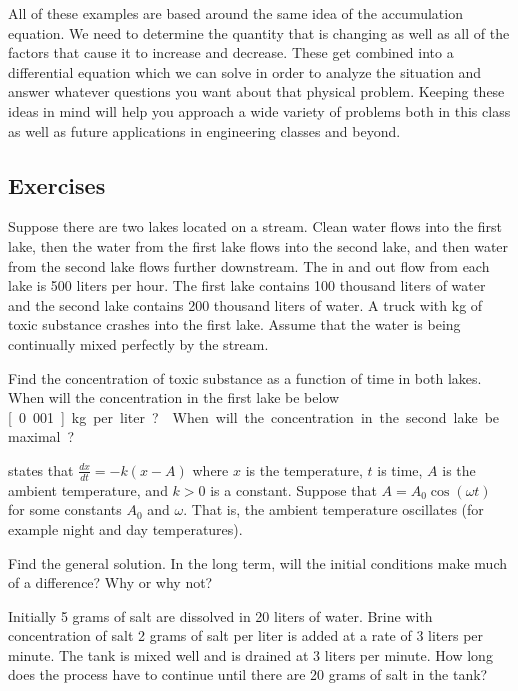 All of these examples are based around the same idea of the accumulation equation. We need to determine the quantity that is changing as well as all of the factors that cause it to increase and decrease. These get combined into a differential equation which we can solve in order to analyze the situation and answer whatever questions you want about that physical problem. Keeping these ideas in mind will help you approach a wide variety of problems both in this class as well as future applications  in engineering classes and beyond.

\subsection{Exercises}

\begin{exercise}
Suppose there are two lakes located on a stream.  Clean
water flows into the first lake,
then the water from the first lake flows into the second lake, and then
water from the second lake flows further downstream.
The in and out flow from each lake is 500 liters per hour.
The first lake contains 100 thousand liters of water and the
second lake contains 200 thousand liters of water.
A truck with \unit[500]{kg} of toxic substance
crashes into the first lake.  Assume that the water is being continually
mixed perfectly by the stream.
\begin{tasks}
\task Find the concentration of toxic substance
as a function of time in both lakes.
\task When will the
concentration in the first lake be below \unit[0.001]{kg} per liter?
\task When will the
concentration in the second lake be maximal?
\end{tasks}
\end{exercise}

\begin{exercise}
 states that $\frac{dx}{dt} = -k(x-A)$ where
$x$ is the temperature, $t$ is time, $A$ is the ambient temperature,
and $k > 0$ is a constant.
Suppose that $A = A_0 \cos (\omega t)$ for some constants $A_0$ and $\omega$.
That is, the ambient temperature oscillates (for example night and day
temperatures).
\begin{tasks}
\task Find the general solution.
\task In the long term, will the
initial conditions make much of a difference?  Why or why not?
\end{tasks}
\end{exercise}

\begin{exercise}
Initially 5 grams of salt are dissolved in 20 liters of water.  Brine
with concentration of salt 2 grams of salt per liter is added at a rate
of 3 liters per minute.  The tank is mixed well and is drained at 3 liters
per minute.  How long does the process have to continue until there are 20 grams
of salt in the tank?
\end{exercise}

